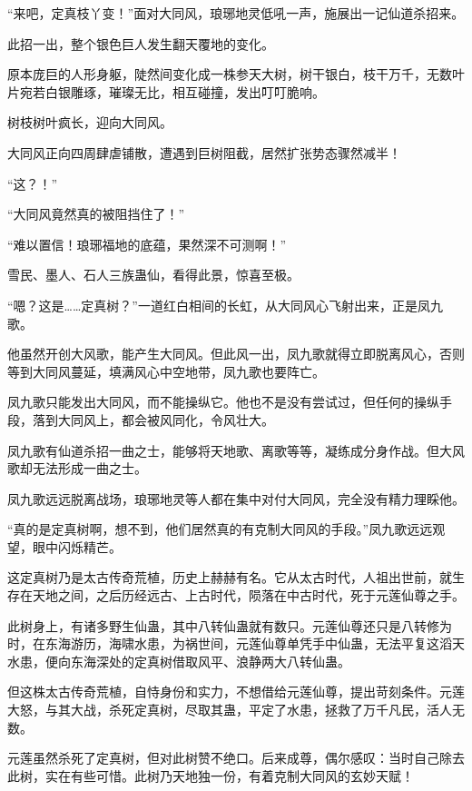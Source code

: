 
\begin{this_body}



“来吧，定真枝丫变！”面对大同风，琅琊地灵低吼一声，施展出一记仙道杀招来。

此招一出，整个银色巨人发生翻天覆地的变化。

原本庞巨的人形身躯，陡然间变化成一株参天大树，树干银白，枝干万千，无数叶片宛若白银雕琢，璀璨无比，相互碰撞，发出叮叮脆响。

树枝树叶疯长，迎向大同风。

大同风正向四周肆虐铺散，遭遇到巨树阻截，居然扩张势态骤然减半！

“这？！”

“大同风竟然真的被阻挡住了！”

“难以置信！琅琊福地的底蕴，果然深不可测啊！”

雪民、墨人、石人三族蛊仙，看得此景，惊喜至极。

“嗯？这是……定真树？”一道红白相间的长虹，从大同风心飞射出来，正是凤九歌。

他虽然开创大风歌，能产生大同风。但此风一出，凤九歌就得立即脱离风心，否则等到大同风蔓延，填满风心中空地带，凤九歌也要阵亡。

凤九歌只能发出大同风，而不能操纵它。他也不是没有尝试过，但任何的操纵手段，落到大同风上，都会被风同化，令风壮大。

凤九歌有仙道杀招一曲之士，能够将天地歌、离歌等等，凝练成分身作战。但大风歌却无法形成一曲之士。

凤九歌远远脱离战场，琅琊地灵等人都在集中对付大同风，完全没有精力理睬他。

“真的是定真树啊，想不到，他们居然真的有克制大同风的手段。”凤九歌远远观望，眼中闪烁精芒。

这定真树乃是太古传奇荒植，历史上赫赫有名。它从太古时代，人祖出世前，就生存在天地之间，之后历经远古、上古时代，陨落在中古时代，死于元莲仙尊之手。

此树身上，有诸多野生仙蛊，其中八转仙蛊就有数只。元莲仙尊还只是八转修为时，在东海游历，海啸水患，为祸世间，元莲仙尊单凭手中仙蛊，无法平复这滔天水患，便向东海深处的定真树借取风平、浪静两大八转仙蛊。

但这株太古传奇荒植，自恃身份和实力，不想借给元莲仙尊，提出苛刻条件。元莲大怒，与其大战，杀死定真树，尽取其蛊，平定了水患，拯救了万千凡民，活人无数。

元莲虽然杀死了定真树，但对此树赞不绝口。后来成尊，偶尔感叹：当时自己除去此树，实在有些可惜。此树乃天地独一份，有着克制大同风的玄妙天赋！


\end{this_body}
